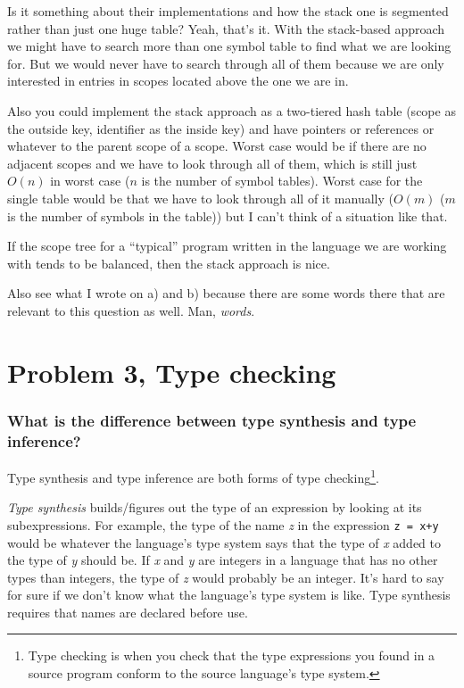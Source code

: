 Is it something about their implementations and how the stack one is segmented rather than just one huge table?
Yeah, that's it.
With the stack-based approach we might have to search more than one symbol table to find what we are looking for.
But we would never have to search through all of them because we are only interested in entries in scopes located above the one we are in.

Also you could implement the stack approach as a two-tiered hash table (scope as the outside key, identifier as the inside key) and have pointers or references or whatever to the parent scope of a scope.
Worst case would be if there are no adjacent scopes and we have to look through all of them, which is still just $O(n)$ in worst case ($n$ is the number of symbol tables).
Worst case for the single table would be that we have to look through all of it manually ($O(m)$ ($m$ is the number of symbols in the table)) but I can't think of a situation like that.

If the scope tree for a ``typical'' program written in the language we are working with tends to be balanced, then the stack approach is nice.

Also see what I wrote on a) and b) because there are some words there that are relevant to this question as well.
Man, \emph{words}.

\newpage
\setcounter{subsubsection}{0}
\section{Problem 3, Type checking}
\subsubsection{What is the difference between type synthesis and type inference?}
Type synthesis and type inference are both forms of type checking\footnote{Type checking is when you check that the type expressions you found in a source program conform to the source language's type system.}.

\emph{Type synthesis} builds/figures out the type of an expression by looking at its subexpressions.
For example, the type of the name \emph{z} in the expression \texttt{z = x+y} would be whatever the language's type system says that the type of \emph{x} added to the type of \emph{y} should be.
If \emph{x} and \emph{y} are integers in a language that has no other types than integers, the type of \emph{z} would probably be an integer.
It's hard to say for sure if we don't know what the language's type system is like.
Type synthesis requires that names are declared before use.

